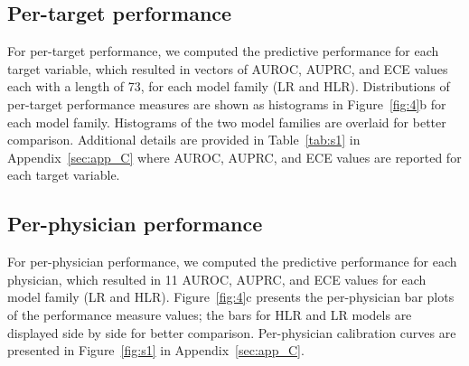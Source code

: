\subsection{Per-target performance} \label{sec:pertarget}
For per-target performance, we computed the predictive performance for each target variable, which resulted in vectors of AUROC, AUPRC, and ECE values each with a length of 73, for each model family (LR and HLR). Distributions of per-target performance measures are shown as histograms in Figure~\ref{fig:4}b for each model family. Histograms of the two model families are overlaid for better comparison. Additional details are provided in Table~\ref{tab:s1} in Appendix~\ref{sec:app_C} where AUROC, AUPRC, and ECE values are reported for each target variable.

\subsection{Per-physician  performance} \label{sec:perphysician}
For per-physician performance, we computed the predictive performance for each physician, which resulted in 11 AUROC, AUPRC, and ECE values for each model family (LR and HLR). Figure~\ref{fig:4}c presents the per-physician bar plots of the performance measure values; the bars for HLR and LR models are displayed side by side for better comparison. Per-physician calibration curves are presented in Figure~\ref{fig:s1} in Appendix~\ref{sec:app_C}.
